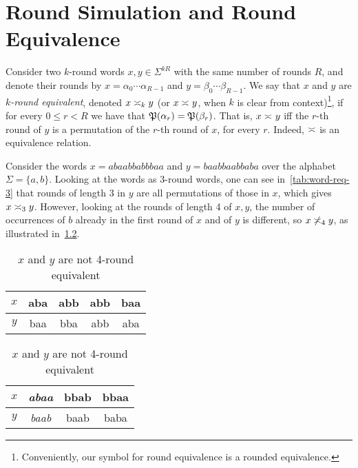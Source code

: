 \chapter{Round Simulation and Round Equivalence}
\label{chap:round_equivalence}

Consider two $k$-round words $x,y\in \Sigma^{kR}$ with the same number of rounds $R$, and denote their rounds by $x=\alpha_0\cdots \alpha_{R-1}$ and $y=\beta_0\cdots \beta_{R-1}$. We say that $x$ and $y$ are \emph{$k$-round equivalent}, denoted $x\req[k] y$ (or $x\req y$, when $k$ is clear from context)\footnote{Conveniently, our symbol for round equivalence is a rounded equivalence.}, if for every $0\le r<R$ we have that $\fP(\alpha_r)=\fP(\beta_r)$. That is, $x\req y$ iff the $r$-th round of $y$ is a permutation of the $r$-th round of $x$, for every $r$. Indeed, $\req$ is an equivalence relation.

\begin{example}
\label{example:word-req}
Consider the words $x=abaabbabbbaa$ and $y=baabbaabbaba$ over the alphabet $\Sigma=\{a,b\}$. Looking at the words as $3$-round words, one can see in~\cref{tab:word-req-3} that rounds of length 3 in $y$ are all permutations of those in $x$, which gives $x\req[3] y$. However, looking at the rounds of length 4 of $x,y$, the number of occurrences of $b$ already in the first round of $x$ and of $y$ is different, so $x\not\req[4] y$, as illustrated in~\cref{tab:word-req-4}.
\begin{table}[!htb]
\hspace{.05\linewidth}%
\begin{minipage}{.4\linewidth}
    \centering
    \caption{$x$ and $y$ are 3-round equivalent}
    \vspace{2mm}
    \begin{tabular}{c||c|c|c|c}
        $x$ & aba & abb & abb & baa \\
        \hline
        $y$ & baa & bba & abb & aba \\
    \end{tabular}
    \label{tab:word-req-3}
\end{minipage}%
\hspace{.1\linewidth}%
\begin{minipage}{.4\linewidth}
    \centering
    \caption{$x$ and $y$ are not 4-round equivalent}
    \vspace{2mm}
    \begin{tabular}{c||c|c|c}
        $x$ & \emph{abaa} & bbab & bbaa \\
        \hline
        $y$ & \emph{baab} & baab & baba \\
    \end{tabular}
    \label{tab:word-req-4}
\end{minipage}
\end{table}
\end{example}

